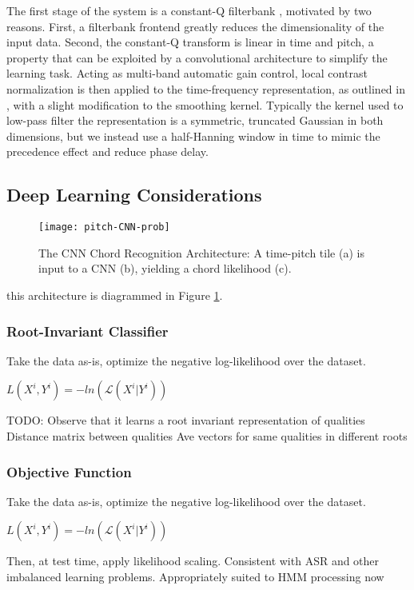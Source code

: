 The first stage of the system is a constant-Q filterbank \cite{Schoerkhuber2009}, motivated by two reasons.
First, a filterbank frontend greatly reduces the dimensionality of the input data.
Second, the constant-Q transform is linear in time and pitch, a property that can be exploited by a convolutional architecture to simplify the learning task.
Acting as multi-band automatic gain control, local contrast normalization is then applied to the time-frequency representation, as outlined in \cite{LeCun2010}, with a slight modification to the smoothing kernel.
Typically the kernel used to low-pass filter the representation is a symmetric, truncated Gaussian in both dimensions, but we instead use a half-Hanning window in time to mimic the precedence effect and reduce phase delay.


\subsection{Deep Learning Considerations}

\begin{figure}[!t]
\centering
\texttt{[image: pitch-CNN-prob]}
\caption{The CNN Chord Recognition Architecture: A time-pitch tile (a) is input to a CNN (b), yielding a chord likelihood (c).}
\label{fig:system}
\end{figure}

this architecture is diagrammed in Figure \ref{fig:system}.


\subsubsection{Root-Invariant Classifier}
Take the data as-is, optimize the negative log-likelihood over the dataset.

$L(X^i, Y^i) = -ln(\mathcal{L}(X^i|Y^i))$

TODO: Observe that it learns a root invariant representation of qualities
Distance matrix between qualities
Ave vectors for same qualities in different roots


\subsubsection{Objective Function}
Take the data as-is, optimize the negative log-likelihood over the dataset.

$L(X^i, Y^i) = -ln(\mathcal{L}(X^i|Y^i))$

Then, at test time, apply likelihood scaling.
Consistent with ASR and other imbalanced learning problems.
Appropriately suited to HMM processing now


